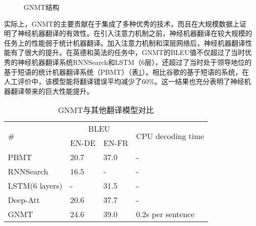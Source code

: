 \begin{figure}[htp]
\centering

\caption{GNMT结构}
\label{fig:6-35}
\end{figure}

\parinterval 实际上，GNMT的主要贡献在于集成了多种优秀的技术，而且在大规模数据上证明了神经机器翻译的有效性。在引入注意力机制之前，神经机器翻译在较大规模的任务上的性能弱于统计机器翻译。加入注意力机制和深层网络后，神经机器翻译性能有了很大的提升。在英德和英法的任务中，GNMT的BLEU值不仅超过了当时优秀的神经机器翻译系统RNNSearch和LSTM（6层），还超过了当时处于领导地位的基于短语的统计机器翻译系统（PBMT）（表\ref{tab:6-10}）。相比谷歌的基于短语的系统，在人工评价中，该模型能将翻译错误平均减少了60\%。这一结果也充分表明了神经机器翻译带来的巨大性能提升。

\begin{table}[htp]
\centering
\caption{GNMT与其他翻译模型对比\cite{Wu2016GooglesNM}}
\label{tab:6-10}
\begin{tabular}{l l l l}
\multicolumn{1}{l|}{\multirow{2}{*}{\#}} & \multicolumn{2}{c}{BLEU} & \multirow{2}{*}{CPU decoding time} \\
\multicolumn{1}{l|}{}                    & EN-DE  & EN-FR  &                                             \\ \hline
\multicolumn{1}{l|}{PBMT}                & 20.7            & 37.0            & -                                           \\
\multicolumn{1}{l|}{RNNSearch}           & 16.5            & -               & -                                           \\
\multicolumn{1}{l|}{LSTM(6 layers)}      & -               & 31.5            & -                                           \\
\multicolumn{1}{l|}{Deep-Att}            & 20.6            & 37.7            & -                                           \\
\multicolumn{1}{l|}{GNMT}                & 24.6            & 39.0            & 0.2s per sentence                           \\
\end{tabular}
\end{table}



